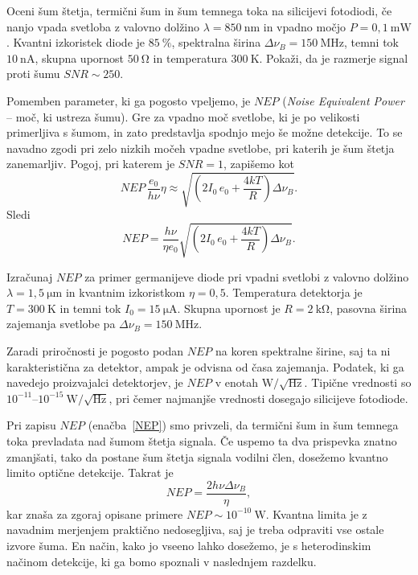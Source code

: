 \begin{definition}
Oceni šum štetja, termični šum in šum temnega toka na silicijevi fotodiodi, če 
nanjo vpada svetloba z valovno dolžino $\lambda=850~\si{\nano\meter}$
in vpadno močjo $P=0,1~\si{\milli\watt}$. Kvantni izkoristek diode je $85~\%$,
spektralna širina $\Delta\nu_B=150~\si{\mega\hertz}$, temni tok $10~\si{\nano\ampere}$,
skupna upornost $50~\si{\ohm}$ in temperatura $300~\si{\kelvin}$. Pokaži, 
da je razmerje signal proti šumu $SNR\sim250$. 
\end{definition}

Pomemben parameter, ki ga pogosto vpeljemo, je $NEP$ ({\it Noise Equivalent Power} -- 
moč, ki ustreza šumu). Gre za vpadno moč svetlobe, ki je po velikosti primerljiva 
s šumom, in zato predstavlja spodnjo mejo še možne detekcije. To se navadno zgodi 
pri zelo nizkih močeh vpadne svetlobe, pri katerih je šum štetja zanemarljiv.
Pogoj, pri katerem je $SNR=1$, zapišemo kot
\begin{equation}
NEP\, \frac{e_0}{h \nu} \eta \approx \sqrt{\left(2 I_0\,e_0
+ \frac{4 kT}{R} \right) \Delta\nu_B}.
\end{equation}
Sledi
\begin{equation}
NEP = \frac{h \nu}{\eta e_0}\sqrt{\left(2 I_0\,e_0
+ \frac{4 kT}{R} \right) \Delta\nu_B}.
\label{NEP}
\end{equation}
\begin{definition}
Izračunaj $NEP$ za primer germanijeve diode pri vpadni svetlobi z valovno dolžino
$\lambda = 1,5~\si{\micro\meter}$ in kvantnim izkoristkom $\eta=0,5$. Temperatura detektorja
je $T=300~\si{\kelvin}$ in temni tok $I_0=15~\si{\micro\ampere}$. Skupna upornost
je $R=2~\si{\kilo\ohm}$, pasovna širina zajemanja svetlobe pa 
$\Delta\nu_B=150~\si{\mega\hertz}$.
\end{definition}

\begin{remark}
Zaradi priročnosti je pogosto podan $NEP$ na koren spektralne širine, saj ta ni 
karakteristična za detektor, ampak je odvisna od časa zajemanja. Podatek, ki 
ga navedejo proizvajalci detektorjev, je $NEP$ v enotah 
$\si{\watt}/\sqrt{\si{\hertz}}$. Tipične vrednosti so 
$10^{-11}$--$10^{-15}~\si{\watt}/\sqrt{\si{\hertz}}$, pri čemer najmanjše vrednosti
dosegajo silicijeve fotodiode. 
\end{remark}

Pri zapisu $NEP$ (enačba~\ref{NEP}) smo privzeli, da termični šum in šum temnega
toka prevladata nad šumom štetja signala. Če uspemo ta dva prispevka znatno 
zmanjšati, tako da postane šum štetja signala vodilni člen, 
dosežemo kvantno limito optične detekcije. Takrat je 
\begin{equation}
NEP = \frac{2 h\nu \Delta \nu_B}{\eta},
\end{equation}
kar znaša za zgoraj opisane primere $NEP \sim 10^{-10}~\si{\watt}$. Kvantna limita
je z navadnim merjenjem praktično nedosegljiva, saj je treba odpraviti vse ostale izvore 
šuma. En način, kako jo vseeno lahko dosežemo, je s heterodinskim načinom
detekcije, ki ga bomo spoznali v naslednjem razdelku.

